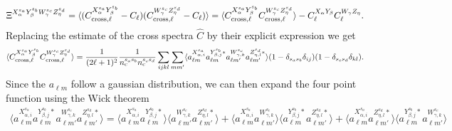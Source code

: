 \documentclass[a4paper, 11pt]{article}
\def\ba{\begin{eqnarray}}
\def\ea{\end{eqnarray}}
\begin{document}
\ba
\Xi^{X^{s_{a}}_{\alpha} Y^{s_{b}}_{\beta} W^{s_{c}}_{\gamma} Z^{s_{d}}_{\eta}} = \langle ( C^{X^{s_{a}}_{\alpha} Y^{s_{b}}_{\beta}}_{\rm cross, \ell} - C_{\ell} )  (C^{ W^{s_{c}}_{\gamma} Z^{s_{d}}_{\eta}}_{\rm cross, \ell}- C_{\ell} )   \rangle =  \langle  C^{X^{s_{a}}_{\alpha} Y^{s_{b}}_{\beta}}_{\rm cross, \ell}  C^{ W^{s_{c}}_{\gamma} Z^{s_{d}}_{\eta}}_{\rm cross, \ell} \rangle-  C^{X_{\alpha} Y_{\beta}}_{\ell} C^{W_{\gamma} Z_{\eta}}_{\ell} .
\ea
Replacing the estimate of the cross spectra $\hat{C}$ by their explicit expression we get
\ba
\langle  C^{X^{s_{a}}_{\alpha} Y^{s_{b}}_{\beta}}_{\rm cross, \ell}  C^{ W^{s_{c}}_{\gamma} Z^{s_{d}}_{\eta}}_{\rm cross, \ell} \rangle =  \frac{1}{(2\ell +1)^{2}}  \frac{1}{n^{s_{a} s_{b}}_{c} n^{s_{c} s_{d}}_{c}} \sum_{ijkl} \sum_{mm'} \langle a^{X^{s_{a}}_{\alpha, i} }_{\ell m}  a^{Y^{s_{b}}_{\beta, j}*}_{\ell m}  a^{W^{s_{c}}_{\gamma, k} }_{\ell m'}  a^{Z^{s_{d}}_{\eta, l}*}_{\ell m'} \rangle (1-\delta_{s_{a}s_{b}}\delta_{ij}) (1-\delta_{s_{c}s_{d}}\delta_{kl}) .
\ea
Since the $a_{\ell m}$ follow a gaussian distribution, we can then expand the four point function using the Wick theorem
\ba
\langle a^{X^{s_{a}}_{\alpha, i} }_{\ell m}  a^{Y^{s_{b}}_{\beta, j}*}_{\ell m}  a^{W^{s_{c}}_{\gamma, k} }_{\ell m'}  a^{Z^{s_{d}}_{\eta, l}*}_{\ell m'} \rangle =  
\langle a^{X^{s_{a}}_{\alpha, i} }_{\ell m}  a^{Y^{s_{b}}_{\beta, j}*}_{\ell m} \rangle \langle a^{W^{s_{c}}_{\gamma, k} }_{\ell m'}  a^{Z^{s_{d}}_{\eta, l}*}_{\ell m'} \rangle +
\langle a^{X^{s_{a}}_{\alpha, i} }_{\ell m}  a^{W^{s_{c}}_{\gamma, k} }_{\ell m'} \rangle \langle a^{Y^{s_{b}}_{\beta, j}*}_{\ell m}    a^{Z^{s_{d}}_{\eta, l}*}_{\ell m'} \rangle +
\langle a^{X^{s_{a}}_{\alpha, i} }_{\ell m}  a^{Z^{s_{d}}_{\eta,l}*}_{\ell m'} \rangle \langle a^{Y^{s_{b}}_{\beta, j}*}_{\ell m}  a^{W^{s_{c}}_{\gamma, k} }_{\ell m'}  \rangle \nonumber
\ea
\end{document}
